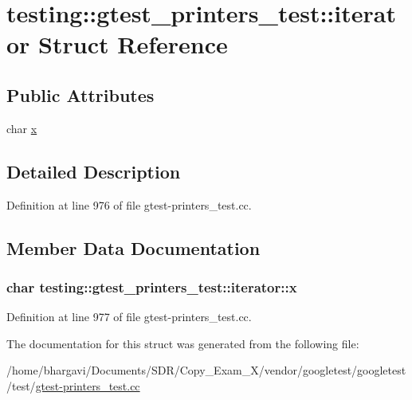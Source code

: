 \hypertarget{structtesting_1_1gtest__printers__test_1_1iterator}{}\section{testing\+:\+:gtest\+\_\+printers\+\_\+test\+:\+:iterator Struct Reference}
\label{structtesting_1_1gtest__printers__test_1_1iterator}
\subsection*{Public Attributes}
\begin{DoxyCompactItemize}
\item 
char \hyperlink{structtesting_1_1gtest__printers__test_1_1iterator_a3d4d056077d3b3869259bdfd60a0778f}{x}
\end{DoxyCompactItemize}


\subsection{Detailed Description}


Definition at line 976 of file gtest-\/printers\+\_\+test.\+cc.



\subsection{Member Data Documentation}
\subsubsection[{\texorpdfstring{x}{x}}]{\setlength{\rightskip}{0pt plus 5cm}char testing\+::gtest\+\_\+printers\+\_\+test\+::iterator\+::x}\hypertarget{structtesting_1_1gtest__printers__test_1_1iterator_a3d4d056077d3b3869259bdfd60a0778f}{}\label{structtesting_1_1gtest__printers__test_1_1iterator_a3d4d056077d3b3869259bdfd60a0778f}


Definition at line 977 of file gtest-\/printers\+\_\+test.\+cc.



The documentation for this struct was generated from the following file\+:\begin{DoxyCompactItemize}
\item 
/home/bhargavi/\+Documents/\+S\+D\+R/\+Copy\+\_\+\+Exam\+\_\+X/vendor/googletest/googletest/test/\hyperlink{gtest-printers__test_8cc}{gtest-\/printers\+\_\+test.\+cc}\end{DoxyCompactItemize}
